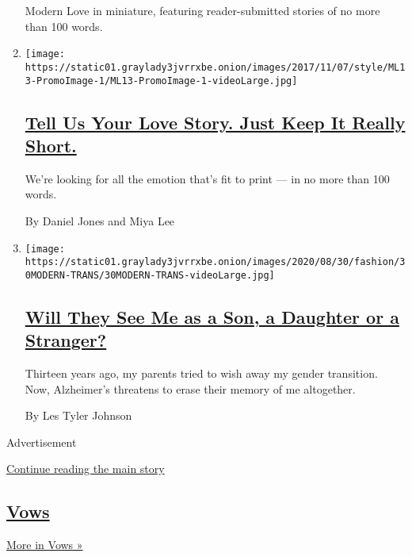 \begin{enumerate}
  Modern Love in miniature, featuring reader-submitted stories of no
  more than 100 words.
\item
  \texttt{[image: https://static01.graylady3jvrrxbe.onion/images/2017/11/07/style/ML13-PromoImage-1/ML13-PromoImage-1-videoLarge.jpg]}

  \hypertarget{tell-us-your-love-story-just-keep-it-really-short}{%
  \subsection{\texorpdfstring{\href{/2018/09/19/style/modern-love-tiny-love-stories.html}{Tell
  Us Your Love Story. Just Keep It Really
  Short.}}{Tell Us Your Love Story. Just Keep It Really Short.}}\label{tell-us-your-love-story-just-keep-it-really-short}}

  We're looking for all the emotion that's fit to print --- in no more
  than 100 words.

  By Daniel Jones and Miya Lee
\item
  \texttt{[image: https://static01.graylady3jvrrxbe.onion/images/2020/08/30/fashion/30MODERN-TRANS/30MODERN-TRANS-videoLarge.jpg]}

  \hypertarget{will-they-see-me-as-a-son-a-daughter-or-a-stranger}{%
  \subsection{\texorpdfstring{\href{/2020/08/28/style/modern-love-transgender-alzheimers-son-daughter-stranger.html}{Will
  They See Me as a Son, a Daughter or a
  Stranger?}}{Will They See Me as a Son, a Daughter or a Stranger?}}\label{will-they-see-me-as-a-son-a-daughter-or-a-stranger}}

  Thirteen years ago, my parents tried to wish away my gender
  transition. Now, Alzheimer's threatens to erase their memory of me
  altogether.

  By Les Tyler Johnson
\end{enumerate}

Advertisement

\protect\hyperlink{after-mid2}{Continue reading the main story}

\hypertarget{vows-4}{%
\subsection{\texorpdfstring{\href{/column/vows}{Vows}}{Vows}}\label{vows-4}}

\href{/column/vows}{More in Vows »}

